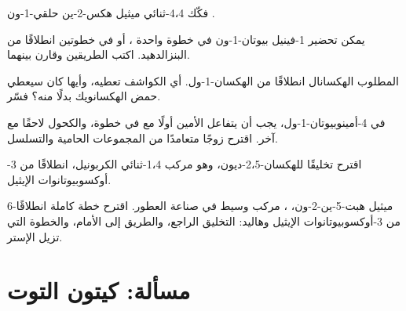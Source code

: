 \begin{exercise}[$\star\star$]\label{exo:b2:retrosynthesis:7}
فكّك 4،4-ثنائي ميثيل هكس-2-ين حلقي-1-ون .
\end{exercise}

\begin{exercise}[$\star\star$]\label{exo:b2:retrosynthesis:8}
يمكن تحضير 1-فينيل بيوتان-1-ون في خطوة واحدة ، أو في خطوتين انطلاقًا من البنزالدهيد.
اكتب الطريقين وقارن بينهما.
\end{exercise}

\begin{exercise}[$\star\star$]\label{exo:b2:retrosynthesis:9}
المطلوب الهكسانال انطلاقًا من الهكسان-1-ول. أي الكواشف تعطيه، وأيها كان سيعطي حمض الهكسانويك
بدلًا منه؟ فسّر.
\end{exercise}

\begin{exercise}[$\star\star\star$]\label{exo:b2:retrosynthesis:10}
في 4-أمينوبيوتان-1-ول، يجب أن يتفاعل الأمين أولًا مع  في خطوة، والكحول
لاحقًا مع آخر. اقترح زوجًا متعامدًا من المجموعات الحامية والتسلسل.
\end{exercise}

\begin{exercise}[$\star\star\star$]\label{exo:b2:retrosynthesis:11}
اقترح تخليقًا للهكسان-2،5-ديون، وهو مركب 1،4-ثنائي الكربونيل، انطلاقًا من 3-أوكسوبيوتانوات الإيثيل.
\end{exercise}

\begin{exercise}[$\star\star\star$]\label{exo:b2:retrosynthesis:12}
6-ميثيل هبت-5-ين-2-ون، ، مركب وسيط في صناعة العطور. اقترح خطة كاملة
انطلاقًا من 3-أوكسوبيوتانوات الإيثيل وهاليد: التخليق الراجع، والطريق إلى الأمام، والخطوة التي تزيل
الإستر.
\end{exercise}

\section{مسألة: كيتون التوت}


